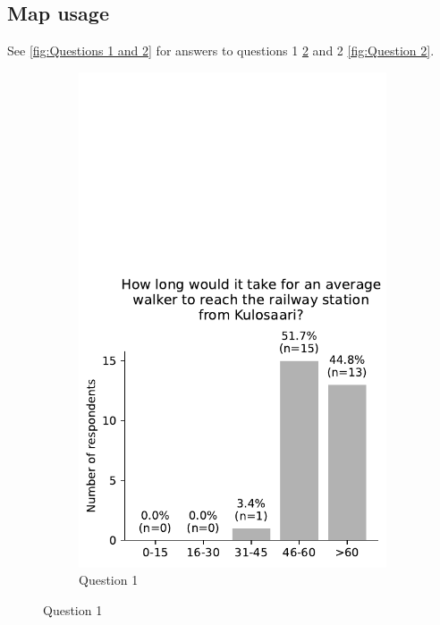 \subsection{Map usage}

See \ref{fig:Questions 1 and 2} for answers to questions 1 \ref{fig:Question 1} and 2 \ref{fig:Question 2}.

\begin{figure}[H]
	\centering
	\begin{subfigure}[b]{0.5\textwidth}
		\centering
		\includegraphics[width=\textwidth]{images/questionnaire/0.pdf}
		\caption{Question 1}
		\label{fig:Question 1}
	\end{subfigure}%

\end{figure}
